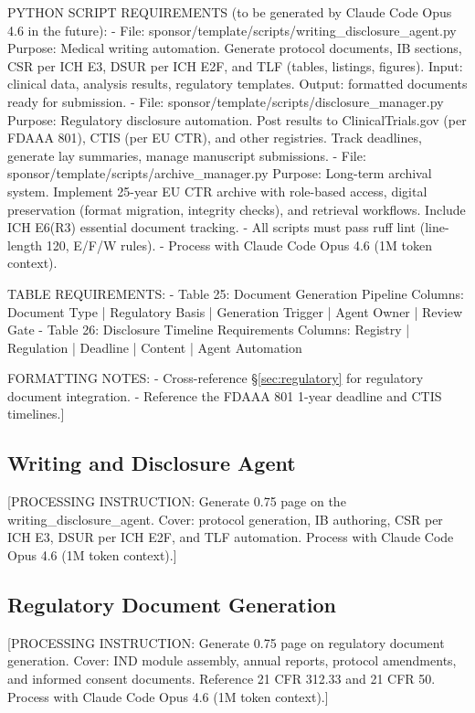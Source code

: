 PYTHON SCRIPT REQUIREMENTS (to be generated by Claude Code Opus 4.6 in the future):
- File: sponsor/template/scripts/writing\_disclosure\_agent.py
  Purpose: Medical writing automation. Generate protocol documents, IB sections,
  CSR per ICH E3, DSUR per ICH E2F, and TLF (tables, listings, figures).
  Input: clinical data, analysis results, regulatory templates.
  Output: formatted documents ready for submission.
- File: sponsor/template/scripts/disclosure\_manager.py
  Purpose: Regulatory disclosure automation. Post results to ClinicalTrials.gov
  (per FDAAA 801), CTIS (per EU CTR), and other registries. Track deadlines,
  generate lay summaries, manage manuscript submissions.
- File: sponsor/template/scripts/archive\_manager.py
  Purpose: Long-term archival system. Implement 25-year EU CTR archive with
  role-based access, digital preservation (format migration, integrity checks),
  and retrieval workflows. Include ICH E6(R3) essential document tracking.
- All scripts must pass ruff lint (line-length 120, E/F/W rules).
- Process with Claude Code Opus 4.6 (1M token context).

TABLE REQUIREMENTS:
- Table 25: Document Generation Pipeline
  Columns: Document Type | Regulatory Basis | Generation Trigger | Agent Owner | Review Gate
- Table 26: Disclosure Timeline Requirements
  Columns: Registry | Regulation | Deadline | Content | Agent Automation

FORMATTING NOTES:
- Cross-reference \S\ref{sec:regulatory} for regulatory document integration.
- Reference the FDAAA 801 1-year deadline and CTIS timelines.]

\subsection{Writing and Disclosure Agent}

[PROCESSING INSTRUCTION: Generate 0.75 page on the writing\_disclosure\_agent. Cover:
protocol generation, IB authoring, CSR per ICH E3, DSUR per ICH E2F, and TLF automation.
Process with Claude Code Opus 4.6 (1M token context).]

\subsection{Regulatory Document Generation}

[PROCESSING INSTRUCTION: Generate 0.75 page on regulatory document generation. Cover:
IND module assembly, annual reports, protocol amendments, and informed consent
documents. Reference 21 CFR 312.33 and 21 CFR 50.
Process with Claude Code Opus 4.6 (1M token context).]

